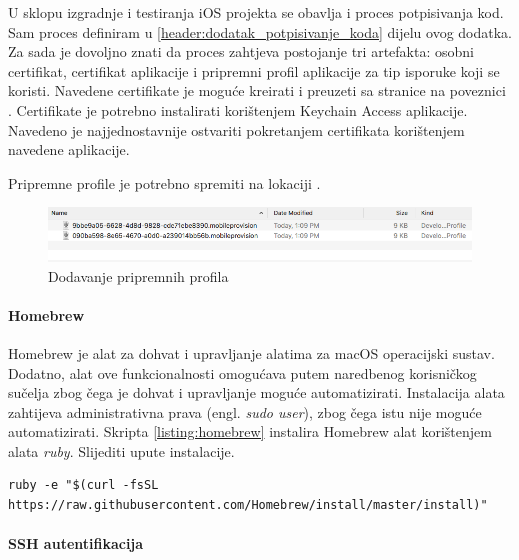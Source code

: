 \documentclass[times, utf8, diplomski, numeric]{fer}
\newcommand{\eng}[1]{(engl. \textit{#1})}
\begin{document}
\begin{appendices}
U sklopu izgradnje i testiranja iOS projekta se obavlja i proces potpisivanja kod. Sam proces definiram u \ref{header:dodatak_potpisivanje_koda} dijelu ovog dodatka. Za sada je dovoljno znati da proces zahtjeva postojanje tri artefakta: osobni certifikat, certifikat aplikacije i pripremni profil aplikacije za tip isporuke koji se koristi. Navedene certifikate je moguće kreirati i preuzeti sa stranice na poveznici . Certifikate je potrebno instalirati korištenjem Keychain Access aplikacije. Navedeno je najjednostavnije ostvariti pokretanjem certifikata korištenjem navedene aplikacije.

Pripremne profile je potrebno spremiti na lokaciji .

\begin{figure}
\centering
\includegraphics[scale=0.4]{DodavanjePripravnihProfila}
\caption{Dodavanje pripremnih profila}
\label{fig:DodavanjePripravnihProfila}
\end{figure}

\paragraph{Homebrew}

Homebrew je alat za dohvat i upravljanje alatima za macOS operacijski sustav\citep{homebrew}. Dodatno, alat ove funkcionalnosti omogućava putem naredbenog korisničkog sučelja zbog čega je dohvat i upravljanje moguće automatizirati. Instalacija alata zahtijeva administrativna prava \eng{sudo user}, zbog čega istu nije moguće automatizirati. Skripta \ref{listing:homebrew} instalira Homebrew alat korištenjem alata \textit{ruby}. Slijediti upute instalacije.

\begin{lstlisting}[caption=Instalacija Homebrew alata, label=listing:homebrew]
ruby -e "$(curl -fsSL https://raw.githubusercontent.com/Homebrew/install/master/install)"
\end{lstlisting}

\paragraph{SSH autentifikacija}


\end{appendices}
\end{document}
